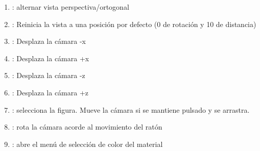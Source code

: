 \begin{enumerate}
	\item {}: alternar vista perspectiva/ortogonal
	\item {}: Reinicia la vista a una posición por defecto (0 de rotación y 10 de distancia)
	\item {}: Desplaza la cámara -x
	\item {}: Desplaza la cámara +x
	\item {}: Desplaza la cámara -z
	\item {}: Desplaza la cámara +z
	\item {}: selecciona la figura. Mueve la cámara si se mantiene pulsado y se arrastra.
	\item {}: rota la cámara acorde al movimiento del ratón
	\item {}: abre el menú de selección de color del material
\end{enumerate}


